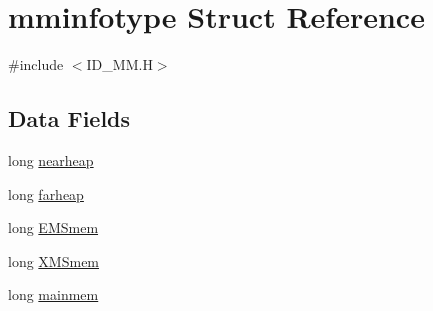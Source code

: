 \hypertarget{structmminfotype}{
\section{mminfotype Struct Reference}
\label{structmminfotype}
}


{\ttfamily \#include $<$ID\_\-MM.H$>$}

\subsection*{Data Fields}
\begin{DoxyCompactItemize}
\item 
long \hyperlink{structmminfotype_af6669912582d407f8e3df71c1ee5b795}{nearheap}
\item 
long \hyperlink{structmminfotype_a20ddd0ecf64b40369b4ccc142a2c5168}{farheap}
\item 
long \hyperlink{structmminfotype_ab6834bcf941e98365c9b22c5f456623c}{EMSmem}
\item 
long \hyperlink{structmminfotype_a2c8bc97d0a622b62a58bb5b2da195cbb}{XMSmem}
\item 
long \hyperlink{structmminfotype_a14052febd497fb9b33325b9ff73c3f49}{mainmem}
\end{DoxyCompactItemize}


